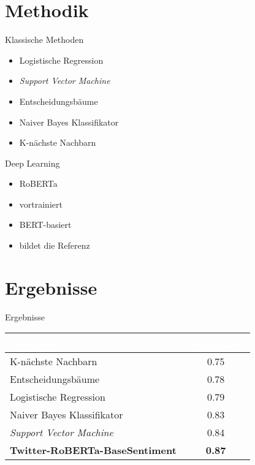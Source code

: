 \documentclass[aspectratio=169]{beamer} %
\begin{document}
\section{Methodik}

\begin{frame}{Klassische Methoden}
  \Large
  \begin{itemize}
      \item Logistische Regression
      \item \textit{Support Vector Machine}
      \item Entscheidungsbäume
      \item Naiver Bayes Klassifikator
      \item K-nächste Nachbarn
  \end{itemize}
\end{frame}

\begin{frame}{Deep Learning}
  \Large
  \begin{itemize}
      \item \glqq RoBERTa\grqq
      \item vortrainiert
      \item BERT-basiert
      \item bildet die Referenz
  \end{itemize}
\end{frame}

\section{Ergebnisse}

\begin{frame}{Ergebnisse}
  \Large
  \begin{tabularx}{\textwidth}{|X|c|}
      \hline
      \rowcolor{aigblue!40} %
      \textcolor{white}{\textbf{Methoden}} & \textcolor{white}{\textbf{Genauigkeit}} \\ \hline
      K-nächste Nachbarn & 0.75 \\ \hline
      Entscheidungsbäume & 0.78 \\ \hline
      Logistische Regression & 0.79 \\ \hline
      Naiver Bayes Klassifikator & 0.83 \\ \hline
      \textit{Support Vector Machine} & 0.84 \\ \hline
      \rowcolor{aigyellow!30} %
      \textbf{Twitter-RoBERTa-BaseSentiment } & \textbf{0.87} \\ \hline
  \end{tabularx}
\end{frame}
\end{document}
